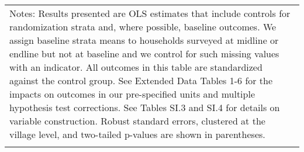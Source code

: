 \begin{longtable}{llcccccccccc}
\hline \hline                                                                                                                                                                                                                                                                                                                                                                                                                                                                                                                                                                                                                                                                                                                                                                                                                                                                           
\multicolumn{12}{p{\textwidth}}{{Notes: Results presented are OLS estimates that include controls for randomization strata and, where possible, baseline outcomes. We assign baseline strata means to households surveyed at midline or endline but not at baseline and we control for such missing values with an indicator. All outcomes in this table are standardized against the control group. See Extended Data Tables 1-6 for the impacts on outcomes in our pre-specified units and multiple hypothesis test corrections. See Tables SI.3 and SI.4 for details on variable construction. Robust standard errors, clustered at the village level, and two-tailed p-values are shown in parentheses. }} \\                                                                                                                                                                       
\multicolumn{12}{p{\textwidth}}{{}} \\                                                                                                                                                                                                                                                                                                                                                                                                                                                                                                                                                                                                                                                                                                                                                                                                                                                  

\end{longtable}
